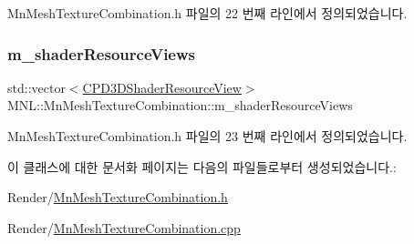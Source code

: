 Mn\+Mesh\+Texture\+Combination.\+h 파일의 22 번째 라인에서 정의되었습니다.

\mbox{\label{class_m_n_l_1_1_mn_mesh_texture_combination_a665314c3b4ca74800ecf2d36245cfa0b}} 
\subsubsection{\texorpdfstring{m\+\_\+shader\+Resource\+Views}{m\_shaderResourceViews}}
{\footnotesize\ttfamily std\+::vector$<$\hyperlink{namespace_m_n_l_a93794d93663474ff79c950ed985565aa}{C\+P\+D3\+D\+Shader\+Resource\+View}$>$ M\+N\+L\+::\+Mn\+Mesh\+Texture\+Combination\+::m\+\_\+shader\+Resource\+Views\hspace{0.3cm}{\ttfamily [private]}}



Mn\+Mesh\+Texture\+Combination.\+h 파일의 23 번째 라인에서 정의되었습니다.



이 클래스에 대한 문서화 페이지는 다음의 파일들로부터 생성되었습니다.\+:\begin{DoxyCompactItemize}
\item 
Render/\hyperlink{_mn_mesh_texture_combination_8h}{Mn\+Mesh\+Texture\+Combination.\+h}\item 
Render/\hyperlink{_mn_mesh_texture_combination_8cpp}{Mn\+Mesh\+Texture\+Combination.\+cpp}\end{DoxyCompactItemize}
